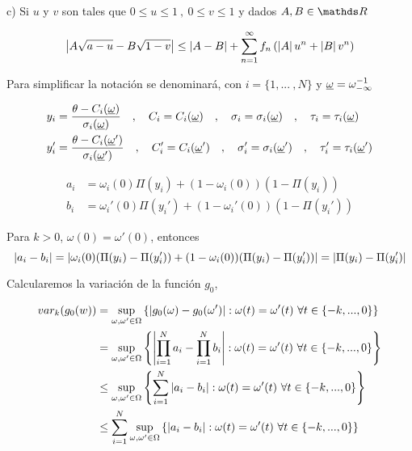 c) Si $u$ y $v$ son tales que $0 \leq u \leq 1 \ , \ 0 \leq v \leq 1$ y dados $A,B \in \reals$ 

\begin{equation}
    \left|A \sqrt{a-u} - B \sqrt{1-v} \right| \leq \left|A-B\right| + \sum_{n=1}^{\infty} f_n \left(\left|A\right| u^n + \left|B\right| v^n\right)
    \label{eqn:desigtriangconproductoria}
\end{equation}

Para simplificar la notación se denominará, con $i=\{1, ... \ , N\}$ y $\underline{\omega}=\omega_{-\infty}^{-1}$ 

\begin{align*}
    y_i&=\frac{\theta-C_i(\underline{\omega})}{\sigma_i(\underline{\omega})} \quad , \quad C_i=C_i(\underline{\omega}) \quad , \quad \sigma_i=\sigma_i(\underline{\omega})  \quad , \quad \tau_i=\tau_i(\underline{\omega}) \\
    y_i'&=\frac{\theta-C_i(\underline{\omega}')}{\sigma_i(\underline{\omega}')} \quad , \quad C_i'=C_i(\underline{\omega}') \quad , \quad \sigma_i'=\sigma_i(\underline{\omega}')  \quad , \quad \tau_i'=\tau_i(\underline{\omega}')
\end{align*}

\begin{align*}
a_i&=\omega_i(0)\Pi(y_i)+(1-\omega_i(0))(1-\Pi(y_i)) \\ 
b_i&=\omega_i'(0)\Pi(y_i')+(1-\omega_i'(0))(1-\Pi(y_i'))
\end{align*}

Para $k>0$, $\omega(0)=\omega'(0)$, entonces
\begin{equation}
    \left|a_i-b_i\right|=\left|\omega_i(0) (\Pi(y_i) - \Pi(y_i')) + (1-\omega_i(0)) (\Pi(y_i) - \Pi(y_i'))\right| = \left|\Pi(y_i)-\Pi(y_i')\right|
    \label{eqn:ayb}
\end{equation}

Calcularemos la variación de la función $g_0$,

\begin{align*}
    var_k(g_0(w)) & = \sup_{\omega,\omega' \in \Omega} \left\{\left|g_0(\omega)-g_0(\omega')\right|: \omega(t)=\omega'(t) \ \forall t \in \{-k, ... ,0\}\right\} \\
    & = \sup_{\omega,\omega' \in \Omega} \left\{\left|\prod_{i=1}^N a_i - \prod_{i=1}^N b_i\right|: \omega(t)=\omega'(t) \ \forall t \in \{-k, ... ,0\}\right\} \\
    & \leq \sup_{\omega,\omega' \in \Omega} \left\{\sum_{i=1}^N \left|a_i - b_i\right| : \omega(t)=\omega'(t) \ \forall t \in \{-k, ... ,0\}\right\} \\
    & \leq \sum_{i=1}^N \sup_{\omega,\omega' \in \Omega} \left\{\left|a_i - b_i\right| : \omega(t)=\omega'(t) \ \forall t \in \{-k, ... ,0\}\right\} 
\end{align*}

